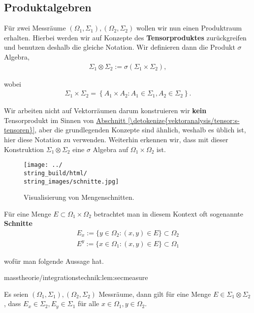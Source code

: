 \documentclass[letterpaper,10pt,german]{jupyterBook}
\begin{document}
\subsection{Produktalgebren}
\label{\detokenize{masstheorie/integrationstechnik:produktalgebren}}
\par
Für zwei Messräume \((\Omega_1,\Sigma_1), (\Omega_2,\Sigma_2)\) wollen wir nun einen Produktraum erhalten. Hierbei werden wir auf Konzepte des \textbf{Tensorproduktes} zurückgreifen und benutzen deshalb die gleiche Notation. Wir definieren dann die Produkt \(\sigma\) Algebra,
\begin{align*}
\Sigma_1\otimes\Sigma_2 := \sigma\left(\Sigma_1\times\Sigma_2\right),
\end{align*}
\par
wobei
\begin{align*}
\Sigma_1\times\Sigma_2 = \left\{A_1\times A_2: A_1\in\Sigma_1, A_2\in\Sigma_2\right\}.
\end{align*}
\par
Wir arbeiten nicht auf Vektorräumen darum konstruieren wir \textbf{kein} Tensorprodukt im Sinnen von \hyperref[\detokenize{vektoranalysis/tensor:s-tensoren}]{Abschnitt \ref{\detokenize{vektoranalysis/tensor:s-tensoren}}}, aber die grundlegenden Konzepte sind ähnlich, weshalb es üblich ist, hier diese Notation zu verwenden. Weiterhin erkennen wir, dass mit dieser Konstruktion \(\Sigma_1\otimes\Sigma_2 \) eine \(\sigma\) Algebra auf \(\Omega_1\times\Omega_2\) ist.

\begin{figure}[htbp]
\centering


\noindent\texttt{[image: ../\\string\_build/html/\\string\_images/schnitte.jpg]}
\caption{Visualisierung von Mengenschnitten.}\label{\detokenize{masstheorie/integrationstechnik:fig-schnitte}}\end{figure}

\par
Für eine Menge \(E\subset\Omega_1\times\Omega_2\) betrachtet man in diesem Kontext oft sogenannte \textbf{Schnitte}
\begin{align*}
E_x := \{y\in \Omega_2: (x,y)\in E\}\subset\Omega_2\\
E^y := \{x\in \Omega_1: (x,y)\in E\}\subset\Omega_1
\end{align*}
\par
wofür man folgende Aussage hat.
\begin{lemma}{}{masstheorie/integrationstechnik:lem:secmeasure}



\par
Es seien \((\Omega_1,\Sigma_1), (\Omega_2,\Sigma_2)\) Messräume, dann gilt für eine Menge \(E\in \Sigma_1\otimes\Sigma_2\), dass \(E_x\in \Sigma_2, E_y\in\Sigma_1\) für alle \(x\in\Omega_1,y\in\Omega_2\).
\end{lemma}
\end{document}
